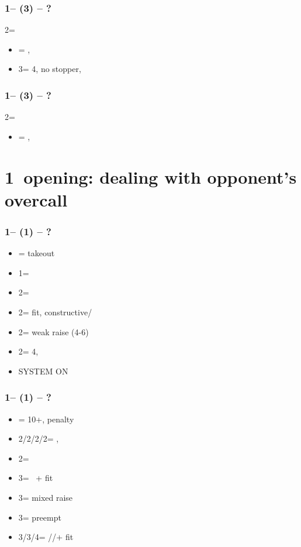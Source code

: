 \subsubsection*{1\diams -- (3\hearts) -- ?}
2\nt = \minor
\begin{itemize}
    \item \dbl = \spades, \gf
    \item 3\spades = 4\spades, no \hearts stopper, \gf
\end{itemize}

\subsubsection*{1\diams -- (3\spades) -- ?}
2\nt = \minor
\begin{itemize}
    \item \dbl = \hearts, \gf
\end{itemize}

\section{\texorpdfstring{1\hearts\ opening: dealing with opponent's overcall}{oppsOvercallTfx1h}}\label{sec:oppsOvercallTfx1h}

\subsubsection*{1\hearts -- (1\spades) -- ?}
\begin{itemize}
    \item \dbl = takeout
    \item 1\nt = \clubs
    \item 2\clubs = \diams
    \item 2\diams = fit, constructive/\gf
    \item 2\hearts = weak raise (4-6)
    \item 2\spades = 4\hearts, \inv
    \item \small{SYSTEM ON}
\end{itemize}

\subsubsection*{1\hearts -- (1\nt) -- ?}
\begin{itemize}
    \item \dbl = 10+, penalty
    \item 2\clubs/2\diams/2\hearts/2\spades = \nat, \nf
    \item 2\nt = \minor
    \item 3\clubs = \inv\ + fit
    \item 3\diams = mixed raise
    \item 3\hearts = preempt
    \item 3\spades/3\nt/4\clubs = \spades/\diams/\clubs + fit
\end{itemize}

